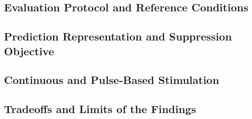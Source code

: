 \subsection{Evaluation Protocol and Reference Conditions}

\subsection{Prediction Representation and Suppression Objective}

\subsection{Continuous and Pulse-Based Stimulation}

\subsection{Tradeoffs and Limits of the Findings}
